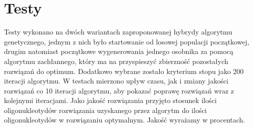 \documentclass{article}
\begin{document}
\section{Testy}
Testy wykonano na dwóch wariantach zaproponowanej hybrydy algorytmu genetycznego, jednym z nich było startowanie od losowej populacji początkowej, drugim natomiast początkowe wygenerowania jednego osobnika za pomocą algorytmu zachłannego, który ma na przyspieszyć zbierzność pozostałych rozwiązań do optimum.
Dodatkowo wybrane zostało kryterium stopu jako 200 iteracji algorytmu.
W testach mierzono upływ czasu, jak i zmiany jakości rozwiązań co 10 iteracji algorytmu, aby pokazać poprawę rozwiązań wraz z kolejnymi iteracjami. Jako jakość rozwiązania przyjęto stosunek ilości oligonukleotydów rozwiązania uzyskanego przez algorytm do ilości oligonukleotydów w rozwiązaniu optymalnym. Jakość wyrażamy w procentach.
\end{document}
